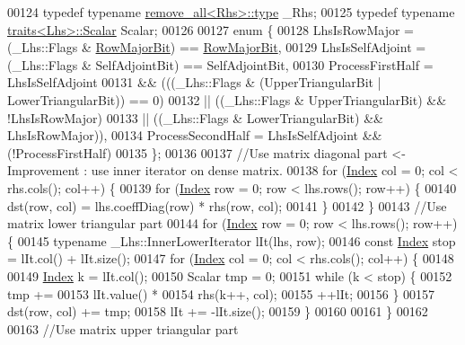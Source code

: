 \begin{DoxyCode}
00124     \textcolor{keyword}{typedef} \textcolor{keyword}{typename} \hyperlink{group___sparse_core___module}{remove\_all<Rhs>::type} \_Rhs;
00125     \textcolor{keyword}{typedef} \textcolor{keyword}{typename} \hyperlink{struct_eigen_1_1internal_1_1traits}{traits<Lhs>::Scalar} Scalar;
00126 
00127     \textcolor{keyword}{enum} \{
00128         LhsIsRowMajor = (\_Lhs::Flags & \hyperlink{group__flags_gae4f56c2a60bbe4bd2e44c5b19cbe8762}{RowMajorBit}) == \hyperlink{group__flags_gae4f56c2a60bbe4bd2e44c5b19cbe8762}{RowMajorBit},
00129         LhsIsSelfAdjoint = (\_Lhs::Flags & SelfAdjointBit) == SelfAdjointBit,
00130         ProcessFirstHalf = LhsIsSelfAdjoint
00131         && (((\_Lhs::Flags & (UpperTriangularBit | LowerTriangularBit)) == 0)
00132         || ((\_Lhs::Flags & UpperTriangularBit) && !LhsIsRowMajor)
00133         || ((\_Lhs::Flags & LowerTriangularBit) && LhsIsRowMajor)),
00134         ProcessSecondHalf = LhsIsSelfAdjoint && (!ProcessFirstHalf)
00135     \};
00136 
00137     \textcolor{comment}{//Use matrix diagonal part <- Improvement : use inner iterator on dense matrix.}
00138     \textcolor{keywordflow}{for} (\hyperlink{namespace_eigen_a62e77e0933482dafde8fe197d9a2cfde}{Index} col = 0; col < rhs.cols(); col++) \{
00139         \textcolor{keywordflow}{for} (\hyperlink{namespace_eigen_a62e77e0933482dafde8fe197d9a2cfde}{Index} row = 0; row < lhs.rows(); row++) \{
00140             dst(row, col) = lhs.coeffDiag(row) * rhs(row, col);
00141         \}
00142     \}
00143     \textcolor{comment}{//Use matrix lower triangular part}
00144     \textcolor{keywordflow}{for} (\hyperlink{namespace_eigen_a62e77e0933482dafde8fe197d9a2cfde}{Index} row = 0; row < lhs.rows(); row++) \{
00145         \textcolor{keyword}{typename} \_Lhs::InnerLowerIterator lIt(lhs, row);
00146         \textcolor{keyword}{const} \hyperlink{namespace_eigen_a62e77e0933482dafde8fe197d9a2cfde}{Index} stop = lIt.col() + lIt.size();
00147         \textcolor{keywordflow}{for} (\hyperlink{namespace_eigen_a62e77e0933482dafde8fe197d9a2cfde}{Index} col = 0; col < rhs.cols(); col++) \{
00148 
00149             \hyperlink{namespace_eigen_a62e77e0933482dafde8fe197d9a2cfde}{Index} k = lIt.col();
00150             Scalar tmp = 0;
00151             \textcolor{keywordflow}{while} (k < stop) \{
00152                 tmp +=
00153                         lIt.value() *
00154                         rhs(k++, col);
00155                 ++lIt;
00156             \}
00157             dst(row, col) += tmp;
00158             lIt += -lIt.size();
00159         \}
00160 
00161     \}
00162 
00163     \textcolor{comment}{//Use matrix upper triangular part}

\end{DoxyCode}
